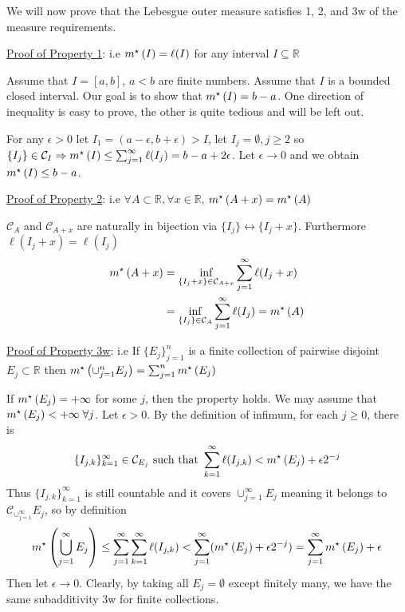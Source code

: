 We will now prove that the Lebesgue outer measure satisfies 1, 2, and 3w of the measure requirements.

\underline{Proof of Property 1}:
i.e $m^{\star}\left(I\right) = \ell(I)$ for any interval $I \subseteq \mathbb{R}$

Assume that $I = [a,b]$, $a < b$ are finite numbers.
Assume that $I$ is a bounded closed interval.
Our goal is to show that $m^{\star}\left(I\right) = b -a$.
One direction of inequality is easy to prove, the other is quite tedious and will be left out.

For any $\epsilon > 0$ let $I_1 = (a-\epsilon, b + \epsilon) > I$, let $I_j = \emptyset, j \geq 2$ so $\{I_j \} \in \mathcal{C}_I \Rightarrow m^{\star}\left(I\right) \leq \sum_{j=1}^{\infty} \ell (I_j) = b - a + 2 \epsilon$.
Let $\epsilon \rightarrow 0$ and we obtain $m^{\star}\left(I\right) \leq b-a$.

\underline{Proof of Property 2}:
i.e $\forall A \subset \mathbb{R}, \forall x \in \mathbb{R}$, $m^{\star}\left(A+x\right) = m^{\star}\left(A\right)$

$\mathcal{C}_A$ and $\mathcal{C}_{A+x}$ are naturally in bijection via $\{ I_j \} \leftrightarrow \{ I_j + x \}$.
Furthermore $\ell (I_j + x) = \ell (I_j)$
\begin{align*}
    m^{\star}\left(A+x\right) &= \inf_{\{I_j +x\} \in \mathcal{C}_{A+x}} \sum_{j=1}^{\infty} \ell (I_j + x) \\
    &= \inf_{\{I_j\} \in \mathcal{C}_{A}} \sum_{j=1}^{\infty} \ell (I_j) = m^{\star}\left(A\right)
\end{align*}

\underline{Proof of Property 3w}:
i.e If $\{ E_j \}_{j=1}^{n}$ is a finite collection of pairwise disjoint $E_j \subset \mathbb{R}$ then $m^{\star}\left(\cup_{j=1}^{n} E_j\right) = \sum_{j=1}^{n} m^{\star}\left(E_j\right)$

If $m^{\star}\left(E_j\right) = +\infty$ for some $j$, then the property holds.
We may assume that $m^{\star}\left(E_j\right) < + \infty \; \forall j$.
Let $\epsilon > 0$.
By the definition of infimum, for each $j \geq 0$, there is
\[
    \{ I_{j,k} \}_{k=1}^{\infty} \in \mathcal{C}_{E_j} \text{ such that } \sum_{k=1}^{\infty} \ell (I_{j,k}) < m^{\star}\left(E_j\right) + \epsilon 2^{-j}
\]
Thus $\{ I_{j,k} \}_{k=1}^{\infty}$ is still countable and it covers $\cup_{j=1}^{\infty} E_j$ meaning it belongs to $\mathcal{C}_{\cup_{j=1}^{\infty}} E_j$, so by definition
\[
   m^{\star}\left(\bigcup_{j=1}^{\infty} E_j\right) \leq \sum_{j=1}^{\infty} \sum_{k=1}^{\infty} \ell (I_{j,k}) < \sum_{j=1}^{\infty} (m^{\star}\left(E_j\right) + \epsilon 2^{-j}) = \sum_{j=1}^{\infty} m^{\star}\left(E_j\right) + \epsilon
\]
Then let $\epsilon \rightarrow 0$.
Clearly, by taking all $E_j = \emptyset$ except finitely many, we have the same subadditivity 3w for finite collections.

